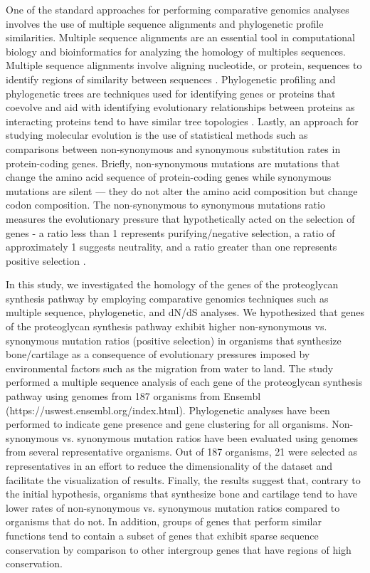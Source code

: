 \documentclass{article}
\begin{document}
One of the standard approaches for performing comparative genomics analyses involves the use of multiple sequence alignments and phylogenetic profile similarities. Multiple sequence alignments are an essential tool in computational biology and bioinformatics for analyzing the homology of multiples sequences. Multiple sequence alignments involve aligning nucleotide, or protein, sequences to identify regions of similarity between sequences \cite{msas}. Phylogenetic profiling and phylogenetic trees are techniques used for identifying genes or proteins that coevolve and aid with identifying evolutionary relationships between proteins as interacting proteins tend to have similar tree topologies \cite{protein_protein, graur}. Lastly, an approach for studying molecular evolution is the use of statistical methods such as comparisons between non-synonymous and synonymous substitution rates in protein-coding genes. Briefly, non-synonymous mutations are mutations that change the amino acid sequence of protein-coding genes while synonymous mutations are silent --- they do not alter the amino acid composition but change codon composition. The non-synonymous to synonymous mutations ratio measures the evolutionary pressure that hypothetically acted on the selection of genes - a ratio less than 1 represents purifying/negative selection, a ratio of approximately 1 suggests neutrality, and a ratio greater than one represents positive selection \cite{dnds, graur}.

In this study, we investigated the homology of the genes of the proteoglycan synthesis pathway by employing comparative genomics techniques such as multiple sequence, phylogenetic, and dN/dS analyses. We hypothesized that genes of the proteoglycan synthesis pathway exhibit higher non-synonymous vs. synonymous mutation ratios (positive selection) in organisms that synthesize bone/cartilage as a consequence of evolutionary pressures imposed by environmental factors such as the migration from water to land. The study performed a multiple sequence analysis of each gene of the proteoglycan synthesis pathway using genomes from 187 organisms from Ensembl (https://uswest.ensembl.org/index.html). Phylogenetic analyses have been performed to indicate gene presence and gene clustering for all organisms. Non-synonymous vs. synonymous mutation ratios have been evaluated using genomes from several representative organisms. Out of 187 organisms, 21 were selected as representatives in an effort to reduce the dimensionality of the dataset and facilitate the visualization of results. Finally, the results suggest that, contrary to the initial hypothesis, organisms that synthesize bone and cartilage tend to have lower rates of non-synonymous vs. synonymous mutation ratios compared to organisms that do not. In addition, groups of genes that perform similar functions tend to contain a subset of genes that exhibit sparse sequence conservation by comparison to other intergroup genes that have regions of high conservation.
\end{document}
